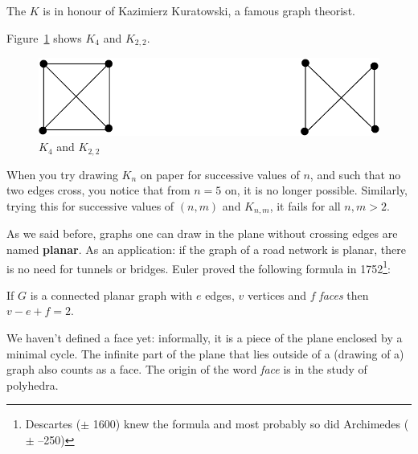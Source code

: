 The $K$ is in honour of Kazimierz Kuratowski, a famous graph theorist.

Figure~\ref{kuratowski1} shows $K_{4}$ and $K_{2,2}$.

\begin{figure}[ht]
\begin{center}
\includegraphics[width=0.4\linewidth,keepaspectratio]{kuratowski1}
\end{center}
\caption{$K_{4}$ and $K_{2,2}$ \label{kuratowski1}}
\end{figure}

When you try drawing $K_{n}$ on paper for successive values of $n$,
and such that no two edges cross, you notice that from $n=5$ on, it is
no longer possible. Similarly, trying this for successive values of
$(n,m)$ and $K_{n,m}$, it fails for all $n,m > 2$.

As we said before, graphs one can draw in the plane without crossing
edges are named \textbf{planar}. As an application: if the graph of a
road network is planar, there is no need for tunnels or bridges. Euler
proved the following formula in 1752\footnote{Descartes
($\pm$ 1600) knew the formula and most probably so did Archimedes
($\pm$ --250)}:

 \begin{theorem}
If $G$ is a connected planar graph with $e$ edges, $v$ vertices and
$f$ {\em faces} then $v-e+f = 2$.
\end{theorem}

We haven't defined a face yet: informally, it is a piece of the plane
enclosed by a minimal cycle. The infinite part of the plane
that lies outside of a (drawing of a) graph also counts as a face. The
origin of the word {\em face} is in the study of polyhedra.



